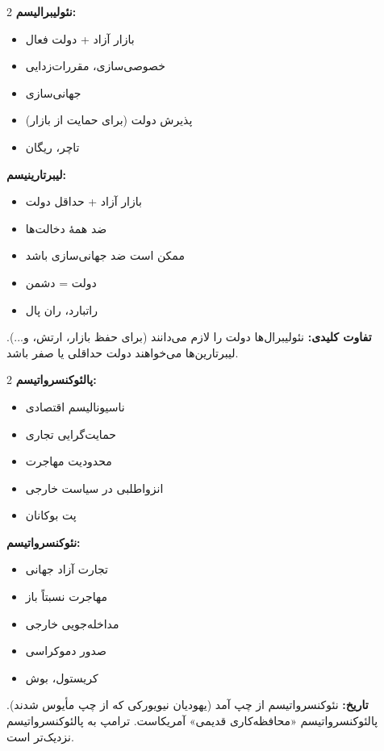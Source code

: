 \begin{tcolorbox}[
    enhanced,
    colback=rightblue!5,
    colframe=rightblue,
    boxrule=1.5pt,
    arc=5pt,
    fonttitle=\bfseries,
    title={\rl{🔵 نئولیبرالیسم در برابر لیبرتارینیسم}}
]
\begin{multicols}{2}
\textbf{نئولیبرالیسم:}
\begin{itemize}
    \item بازار آزاد + دولت فعال
    \item خصوصی‌سازی، مقررات‌زدایی
    \item جهانی‌سازی
    \item پذیرش دولت (برای حمایت از بازار)
    \item تاچر، ریگان
\end{itemize}

\columnbreak

\textbf{لیبرتارینیسم:}
\begin{itemize}
    \item بازار آزاد + حداقل دولت
    \item ضد همهٔ دخالت‌ها
    \item ممکن است ضد جهانی‌سازی باشد
    \item دولت = دشمن
    \item راتبارد، ران پال
\end{itemize}
\end{multicols}

\textbf{تفاوت کلیدی:} نئولیبرال‌ها دولت را لازم می‌دانند (برای حفظ بازار، ارتش، و...). لیبرتارین‌ها می‌خواهند دولت حداقلی یا صفر باشد.
\end{tcolorbox}

\begin{tcolorbox}[
    enhanced,
    colback=rightblue!5,
    colframe=rightblue,
    boxrule=1.5pt,
    arc=5pt,
    fonttitle=\bfseries,
    title={\rl{🔵 پالئوکنسرواتیسم در برابر نئوکنسرواتیسم}}
]
\begin{multicols}{2}
\textbf{پالئوکنسرواتیسم:}
\begin{itemize}
    \item ناسیونالیسم اقتصادی
    \item حمایت‌گرایی تجاری
    \item محدودیت مهاجرت
    \item انزواطلبی در سیاست خارجی
    \item پت بوکانان
\end{itemize}

\columnbreak

\textbf{نئوکنسرواتیسم:}
\begin{itemize}
    \item تجارت آزاد جهانی
    \item مهاجرت نسبتاً باز
    \item مداخله‌جویی خارجی
    \item صدور دموکراسی
    \item کریستول، بوش
\end{itemize}
\end{multicols}

\textbf{تاریخ:} نئوکنسرواتیسم از چپ آمد (یهودیان نیویورکی که از چپ مأیوس شدند). پالئوکنسرواتیسم «محافظه‌کاری قدیمی» آمریکاست. ترامپ به پالئوکنسرواتیسم نزدیک‌تر است.
\end{tcolorbox}

